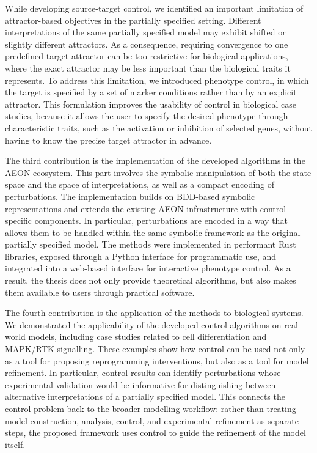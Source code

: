 While developing source-target control, we identified an important limitation
of attractor-based objectives in the partially specified setting. Different
interpretations of the same partially specified model may exhibit shifted or
slightly different attractors. As a consequence, requiring convergence to one
predefined target attractor can be too restrictive for biological applications,
where the exact attractor may be less important than the biological traits it
represents. To address this limitation, we introduced phenotype control, in
which the target is specified by a set of marker conditions rather than by an
explicit attractor. This formulation improves the usability of control in
biological case studies, because it allows the user to specify the desired
phenotype through characteristic traits, such as the activation or inhibition
of selected genes, without having to know the precise target attractor in
advance.

The third contribution is the implementation of the developed algorithms in
the AEON ecosystem. This part involves the symbolic manipulation of both the state space and the
space of interpretations, as well as a compact encoding of perturbations. The
implementation builds on BDD-based symbolic representations and extends
the existing AEON infrastructure with control-specific components. In
particular, perturbations are encoded in a way that allows them to be handled
within the same symbolic framework as the original partially specified model.
The methods were implemented in performant Rust libraries, exposed
through a Python interface for programmatic use, and integrated into a
web-based interface for interactive phenotype control. As a result, the thesis
does not only provide theoretical algorithms, but also makes them available
to users through practical software.

The fourth contribution is the application of the methods to biological
systems. We demonstrated the applicability of the developed control
algorithms on real-world models, including case studies related to cell
differentiation and MAPK/RTK signalling. These examples show how control
can be used not only as a tool for proposing reprogramming interventions,
but also as a tool for model refinement. In particular, control results can
identify perturbations whose experimental validation would be informative
for distinguishing between alternative interpretations of a partially specified
model. This connects the control problem back to the broader modelling
workflow: rather than treating model construction, analysis, control, and
experimental refinement as separate steps, the proposed framework uses
control to guide the refinement of the model itself.

